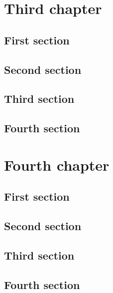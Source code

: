 \documentclass{researchbook}
\begin{document}
\chapter{Third chapter}

\section{First section}\lipsum
\section{Second section}\lipsum
\section{Third section}\lipsum
\section{Fourth section}\lipsum


\chapter{Fourth chapter}

\section{First section}\lipsum
\section{Second section}\lipsum
\section{Third section}\lipsum
\section{Fourth section}\lipsum


\customcover{}{}{}{}
\end{document}

